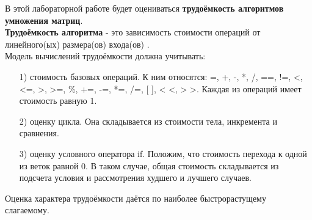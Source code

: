 В этой лабораторной работе будет оцениваться \textbf{трудоёмкость алгоритмов умножения матриц}.\\

\textbf{Трудоёмкость алгоритма} - это зависимость стоимости операций от линейного(ых) размера(ов) входа(ов) \cite{labor_int}.\\

Модель вычислений трудоёмкости должна учитывать:
\begin{itemize}
	\item[1)] стоимость базовых операций. К ним относятся: =, +, -, *, /, ==, !=, <, <=, >, >=, \%, +=, -=, *=, /=, [ ], < <, > >. Каждая из операций имеет стоимость равную 1.
	\item[2)] оценку цикла. Она складывается из стоимости тела, инкремента и сравнения. 
	\item[3)] оценку условного оператора if. Положим, что стоимость перехода к одной из веток равной 0. В таком случае, общая стоимость складывается из подсчета условия и рассмотрения худшего и лучшего случаев.
\end{itemize}

Оценка характера трудоёмкости даётся по наиболее быстрорастущему слагаемому.\\

